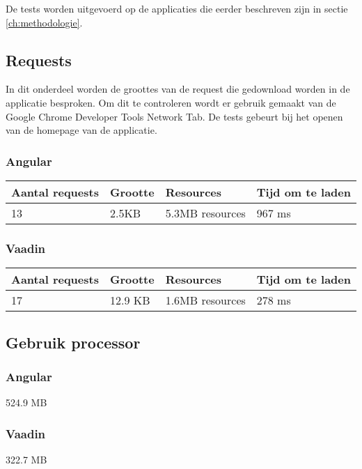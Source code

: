 De tests worden uitgevoerd op de applicaties die eerder beschreven zijn in sectie \ref{ch:methodologie}.

\subsection{Requests}
In dit onderdeel worden de groottes van de request die gedownload worden in de applicatie besproken. Om dit te controleren wordt er gebruik gemaakt van de Google Chrome Developer Tools Network Tab. De tests gebeurt bij het openen van de homepage van de applicatie.
\subsubsection{Angular}

\begin{table}[H]
	\begin{tabular}{|l|l|l|l|}
		\hline
		\textbf{Aantal requests} & \textbf{Grootte} & \textbf{Resources} & \textbf{Tijd om te laden} \\ \hline
		13                       & 2.5KB            & 5.3MB resources    & 967 ms                    \\ \hline
	\end{tabular}
\end{table}
\subsubsection{Vaadin}
\begin{table}[H]
	\begin{tabular}{|l|l|l|l|}
		\hline
		\textbf{Aantal requests} & \textbf{Grootte} & \textbf{Resources} & \textbf{Tijd om te laden} \\ \hline
		17                       & 12.9 KB          & 1.6MB resources    & 278 ms                    \\ \hline
	\end{tabular}
\end{table}

\subsection{Gebruik processor}

\subsubsection{Angular}
524.9 MB

\subsubsection{Vaadin}
322.7 MB

